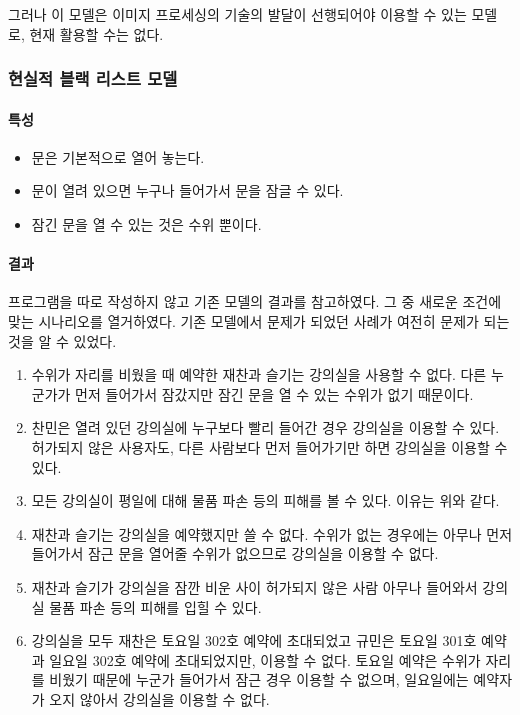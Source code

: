 \documentclass[11pt,a4paper]{article}
\begin{document}
그러나 이 모델은 이미지 프로세싱의 기술의 발달이 선행되어야 이용할 수 있는
모델로, 현재 활용할 수는 없다.

\subsubsection{현실적 블랙 리스트 모델}

\paragraph{특성}
\begin{itemize}
\item 문은 기본적으로 열어 놓는다.
\item 문이 열려 있으면 누구나 들어가서 문을 잠글 수 있다.
\item 잠긴 문을 열 수 있는 것은 수위 뿐이다.
\end{itemize}

\paragraph{결과}
\hfill\break
\indent
프로그램을 따로 작성하지 않고 기존 모델의 결과를 참고하였다. 그 중 새로운
조건에 맞는 시나리오를 열거하였다. 기존 모델에서 문제가 되었던 사례가 여전히
문제가 되는 것을 알 수 있었다.

\begin{enumerate}
\item 수위가 자리를 비웠을 때 예약한 재찬과 슬기는 강의실을 사용할 수 없다.
다른 누군가가 먼저 들어가서 잠갔지만 잠긴 문을 열 수 있는 수위가 없기 때문이다.
\item 찬민은 열려 있던 강의실에 누구보다 빨리 들어간 경우 강의실을 이용할 수
있다. 허가되지 않은 사용자도, 다른 사람보다 먼저 들어가기만 하면 강의실을
이용할 수 있다.
\item 모든 강의실이 평일에 대해 물품 파손 등의 피해를 볼 수 있다. 이유는 위와
같다.
\item 재찬과 슬기는 강의실을 예약했지만 쓸 수 없다. 수위가 없는 경우에는 아무나
먼저 들어가서 잠근 문을 열어줄 수위가 없으므로 강의실을 이용할 수 없다.
\item 재찬과 슬기가 강의실을 잠깐 비운 사이 허가되지 않은 사람 아무나 들어와서
강의실 물품 파손 등의 피해를 입힐 수 있다.
\item 강의실을 모두 재찬은 토요일 302호 예약에 초대되었고 규민은 토요일 301호
예약과 일요일 302호 예약에 초대되었지만, 이용할 수 없다. 토요일 예약은 수위가
자리를 비웠기 때문에 누군가 들어가서 잠근 경우 이용할 수 없으며, 일요일에는
예약자가 오지 않아서 강의실을 이용할 수 없다.
\end{enumerate}
\end{document}
